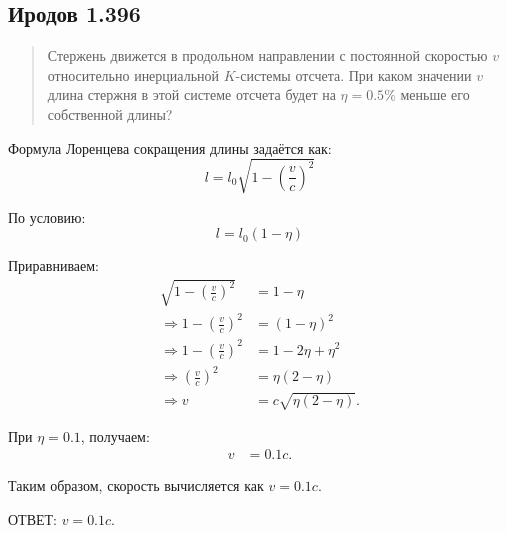 \subsection*{Иродов 1.396}

\setcounter{equation}{0}

\begin{abstract}
Стержень движется в продольном направлении с постоянной скоростью \( v \) относительно инерциальной \( K \)-системы отсчета. 
При каком значении \( v \) длина стержня в этой системе отсчета будет на \( \eta = 0.5\% \) меньше его собственной длины?
\end{abstract}

\noindent\hrulefill

Формула Лоренцева сокращения длины задаётся как:
\begin{equation*}
    l = l_0 \sqrt{1 - \left( \frac{v}{c} \right)^2}
\end{equation*}

По условию:
\begin{equation*}
    l = l_0 (1 - \eta)
\end{equation*}

Приравниваем:
\begin{align*}
    \sqrt{1 - \left( \frac{v}{c} \right)^2} &= 1 - \eta \\
    \Rightarrow 1 - \left( \frac{v}{c} \right)^2 &= (1 - \eta)^2 \\
    \Rightarrow 1 -\left( \frac{v}{c} \right)^2 &= 1 -2\eta + \eta^2 \\
    \Rightarrow \left( \frac{v}{c} \right)^2 &= \eta (2 - \eta) \\
    \Rightarrow v &= c \sqrt{\eta (2 - \eta)}.
\end{align*}


При \( \eta = 0.1 \), получаем:
\begin{align*}
    v &= 0.1c.
\end{align*}

Таким образом, скорость вычисляется как \( v = 0.1c \).


ОТВЕТ: \( v = 0.1c \).